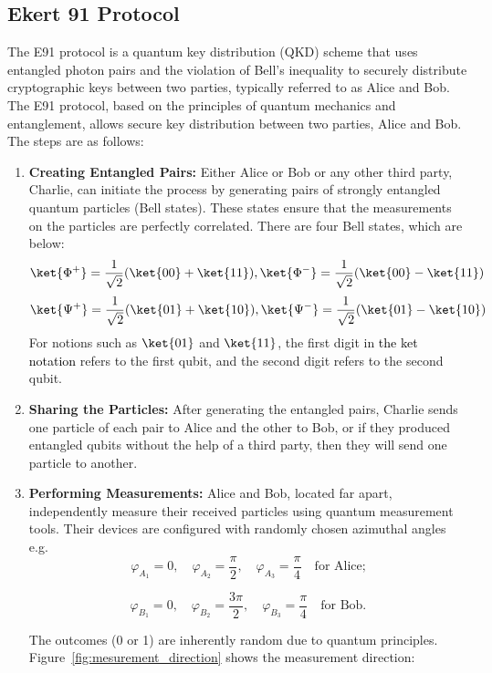 \documentclass[a4paper]{cas-sc}
\begin{document}
\subsection{Ekert 91 Protocol}
\label{sec:e91}
The E91 protocol is a quantum key distribution (QKD) scheme that uses entangled photon pairs and the violation of Bell's inequality to securely distribute cryptographic keys between two parties, typically referred to as Alice and Bob. The E91 protocol, based on the principles of quantum mechanics and entanglement, allows secure key distribution between two parties, Alice and Bob. The steps are as follows:
\begin{enumerate}
    \item \textbf{Creating Entangled Pairs:} Either Alice or Bob or any other third party, Charlie, can initiate the process by generating pairs of strongly entangled quantum particles (Bell states). These states ensure that the measurements on the particles are perfectly correlated. There are four Bell states, which are below:
          \[\ket{\Phi^{+}}=\frac{1}{\sqrt{2}}(\ket{00}+\ket{11}),\ket{\Phi^{-}}=\frac{1}{\sqrt{2}}(\ket{00}-\ket{11})\]
          \[\ket{\Psi^{+}}=\frac{1}{\sqrt{2}}(\ket{01}+\ket{10}),\ket{\Psi^{-}}=\frac{1}{\sqrt{2}}(\ket{01}-\ket{10})\]
          For notions such as $\ket{01}$ and \textcolor{black}{$\ket{11}$}, the first digit in \textcolor{black}{the ket notation} refers to the first qubit, and the second digit refers to the second qubit.

    \item \textbf{Sharing the Particles:} After generating the entangled pairs, Charlie sends one particle of each pair to Alice and the other to Bob, or if they produced entangled qubits without the help of a third party, then they will send one particle to another.
    \item \textbf{Performing Measurements:} Alice and Bob, located far apart, independently measure their received particles using quantum measurement tools. Their devices are configured with randomly chosen azimuthal angles e.g.  \[
              \varphi_{A_1} = 0, \quad \varphi_{A_2} = \frac{\pi}{2}, \quad \varphi_{A_3} = \frac{\pi}{4} \quad \text{for Alice;}
          \]

          \[
              \varphi_{B_1} = 0, \quad \varphi_{B_2} = \frac{3\pi}{2}, \quad \varphi_{B_3} = \frac{\pi}{4} \quad \text{for Bob.}
          \]

          The outcomes (0 or 1) are inherently random due to quantum principles.
          Figure~\ref{fig:mesurement_direction} shows the measurement direction:


\end{enumerate}
\end{document}
